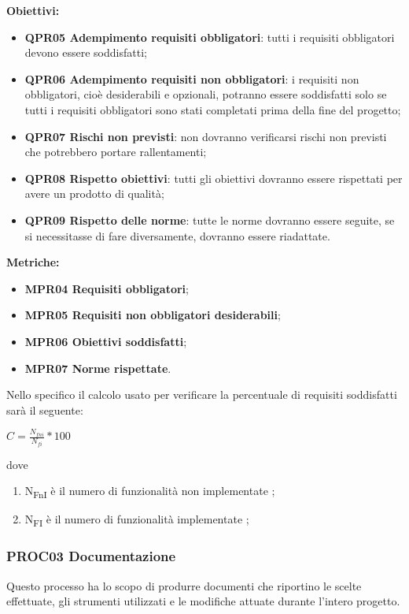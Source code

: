 \documentclass[../piano_di_qualifica.tex]{subfiles}
\begin{document}
\textbf{Obiettivi:}
\smallbreak
\begin{itemize}
	\item \textbf{QPR05 Adempimento requisiti obbligatori}: tutti i requisiti obbligatori devono essere soddisfatti;
	\item \textbf{QPR06 Adempimento requisiti non obbligatori}: i requisiti non obbligatori, cioè desiderabili e opzionali, potranno essere soddisfatti solo se tutti i requisiti obbligatori sono stati completati prima della fine del progetto;
	\item \textbf{QPR07 Rischi non previsti}: non dovranno verificarsi rischi non previsti che potrebbero portare rallentamenti;
	\item \textbf{QPR08 Rispetto obiettivi}: tutti gli obiettivi dovranno essere rispettati per avere un prodotto di qualità;
	\item \textbf{QPR09 Rispetto delle norme}: tutte le norme dovranno essere seguite, se si necessitasse di fare diversamente, dovranno essere riadattate.
\end{itemize}

\textbf{Metriche:}
\smallbreak
\begin{itemize}
	\item \textbf{MPR04 Requisiti obbligatori};
	\item \textbf{MPR05 Requisiti non obbligatori desiderabili};
	\item \textbf{MPR06 Obiettivi soddisfatti};
	\item \textbf{MPR07 Norme rispettate}.
\end{itemize}

Nello specifico il calcolo usato per verificare la percentuale di requisiti soddisfatti sarà il seguente: \par
\begin{center}
	$C = \frac{N_{fni}}{N_{fi}} * 100$
\end{center}

dove
\begin{enumerate}
	\item N\textsubscript{FnI} è il numero di funzionalità non implementate ;
	\item N\textsubscript{FI} è il numero di funzionalità implementate ;
\end{enumerate}

\subsubsection{PROC03 Documentazione}
Questo processo ha lo scopo di produrre documenti che riportino le scelte effettuate, gli strumenti utilizzati e le modifiche attuate durante l'intero progetto. \\
\end{document}
